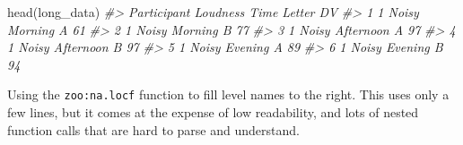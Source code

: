 \documentclass[
]{book}
\newenvironment{Shaded}{\begin{snugshade}}{\end{snugshade}}
\newcommand{\CommentTok}[1]{\textcolor[rgb]{0.56,0.35,0.01}{\textit{#1}}}
\newcommand{\FunctionTok}[1]{\textcolor[rgb]{0.00,0.00,0.00}{#1}}
\newcommand{\NormalTok}[1]{#1}
\theoremstyle{definition}
\theoremstyle{definition}
\theoremstyle{definition}
\theoremstyle{definition}
\theoremstyle{remark}
\begin{document}
\begin{Shaded}
\begin{Highlighting}[]
\FunctionTok{head}\NormalTok{(long\_data)}
\CommentTok{\#\textgreater{}   Participant Loudness      Time Letter DV}
\CommentTok{\#\textgreater{} 1           1    Noisy   Morning      A 61}
\CommentTok{\#\textgreater{} 2           1    Noisy   Morning      B 77}
\CommentTok{\#\textgreater{} 3           1    Noisy Afternoon      A 97}
\CommentTok{\#\textgreater{} 4           1    Noisy Afternoon      B 97}
\CommentTok{\#\textgreater{} 5           1    Noisy   Evening      A 89}
\CommentTok{\#\textgreater{} 6           1    Noisy   Evening      B 94}
\end{Highlighting}
\end{Shaded}

Using the \texttt{zoo:na.locf} function to fill level names to the right. This uses only a few lines, but it comes at the expense of low readability, and lots of nested function calls that are hard to parse and understand.
\end{document}
